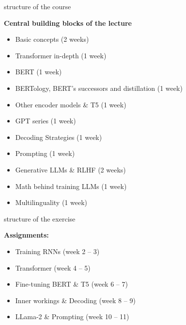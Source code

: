 \documentclass[11pt,compress,t,notes=noshow, xcolor=table]{beamer}
\begin{document}
\begin{frame}{structure of the course}

\vfill

\textbf{Central building blocks of the lecture}

	\begin{itemize}
		\item Basic concepts (2 weeks)
		\item Transformer in-depth (1 week)
		\item BERT (1 week)
		\item BERTology, BERT's successors and distillation (1 week)
		\item Other encoder models \& T5 (1 week)
		\item GPT series (1 week)
		\item Decoding Strategies (1 week)
		\item Prompting (1 week)
		\item Generative LLMs \& RLHF (2 weeks)
		\item Math behind training LLMs (1 week)
		\item Multilinguality (1 week)
	\end{itemize}

\vfill

\end{frame}


\begin{frame}{structure of the exercise}

\vfill

\textbf{Assignments:}

	\begin{itemize}
		\item Training RNNs (week 2 -- 3)
		\item Transformer (week 4 -- 5)
		\item Fine-tuning BERT \& T5 (week 6 -- 7)
		\item Inner workings \& Decoding (week 8 -- 9)
		\item LLama-2 \& Prompting (week 10 -- 11)
	\end{itemize}

\vfill

\end{frame}

\end{document}
